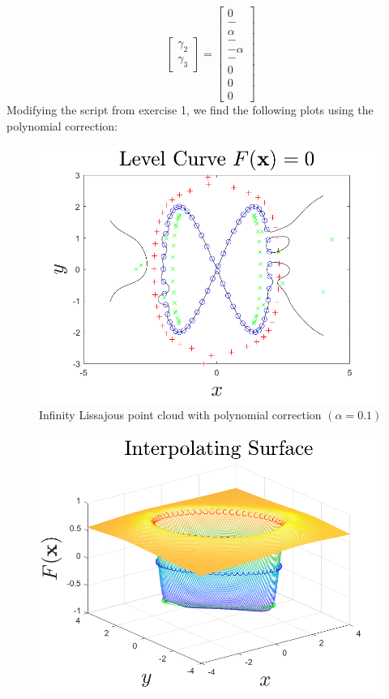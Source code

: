 \documentclass{article}
\begin{document}
\begin{itemize}
\[\begin{bmatrix}
        \gamma_2\\
        \gamma_3
    \end{bmatrix} = \begin{bmatrix}
        0\\
        -\\
        \alpha\\
        -\\
        -\alpha\\
        -\\
        0\\
        0\\
        0
    \end{bmatrix}\]
    Modifying the script from exercise 1, we find the following plots using the polynomial correction:
    \begin{figure}[H]
        \includegraphics[scale = 0.4]{infinity_interp_poly.png}
        \centering
        \caption{Infinity Lissajous point cloud with polynomial correction $(\alpha = 0.1)$}
    \end{figure}
    \begin{figure}[H]
        \includegraphics[scale = 0.35]{interpSurf_skewed_poly.png}

\end{figure}
\end{itemize}
\end{document}
